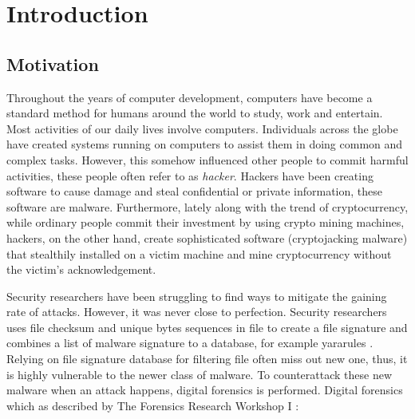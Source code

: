 \chapter[Introduction]{Introduction}

\section[Motivation]{Motivation}

Throughout the years of computer development, computers have become a standard method for humans around the world to study, work and entertain. Most activities of our daily lives involve computers. Individuals across the globe have created systems running on computers to assist them in doing common and complex tasks. However, this somehow influenced other people to commit harmful activities, these people often refer to as \textit{hacker}. Hackers have been creating software to cause damage and steal confidential or private information, these software are malware. Furthermore, lately along with the trend of cryptocurrency, while ordinary people commit their investment by using crypto mining machines, hackers, on the other hand, create sophisticated software (cryptojacking malware) that stealthily installed on a victim machine and mine cryptocurrency without the victim's acknowledgement.

Security researchers have been struggling to find ways to mitigate the gaining rate of attacks. However, it was never close to perfection. Security researchers uses file checksum and unique bytes sequences in file to create a file signature and combines a list of malware signature to a database, for example yararules \cite{yararules}. Relying on file signature database for filtering file often miss out new one, thus, it is highly vulnerable to the newer class of malware. To counterattack these new malware when an attack happens, digital forensics is performed. Digital forensics which as described by The Forensics Research Workshop I \cite{roadmap}:


